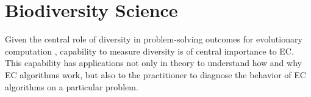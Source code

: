 \section{Biodiversity Science}
\label{sec:diversity-measures}

%
%
Given the central role of diversity in problem-solving outcomes for evolutionary computation \citep{mcphee1999analysis,michalewicz1996genetic,gabor2021productive}, capability to measure diversity is of central importance to EC.
This capability has applications not only in theory to understand how and why EC algorithms work, but also to the practitioner to diagnose the behavior of EC algorithms on a particular problem.

